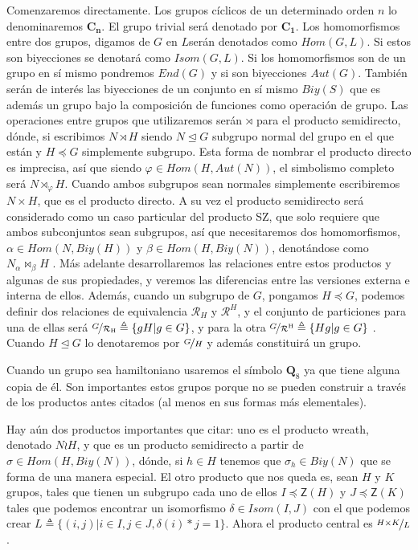 \documentclass[12pt,a4paper,fleqn,spanish,final,openright]{extbook}
\theoremstyle{definition}
\theoremstyle{remark}
\begin{document}
Comenzaremos directamente. Los grupos cíclicos de un determinado orden
$n$ lo denominaremos $\mathbf{C_{n}}$. El grupo trivial será denotado
por $\mathbf{C_1}$. Los homomorfismos entre dos grupos, digamos
de $G$ en $L$serán denotados como $Hom(G,L)$. Si estos son biyecciones
se denotará como $Isom(G,L)$. Si los homomorfismos son de un grupo
en sí mismo pondremos $End(G)$ y si son biyecciones $Aut(G)$. También
serán de interés las biyecciones de un conjunto en sí mismo $Biy(S)$
que es además un grupo bajo la composición de funciones como operación
de grupo. Las operaciones entre grupos que utilizaremos serán $\rtimes$
para el producto semidirecto, dónde, si escribimos $N\rtimes H$ siendo
$N \trianglelefteq G$ subgrupo normal del grupo en el que están y
$H \preccurlyeq G$ simplemente subgrupo. Esta forma de nombrar el
producto directo es imprecisa, así que siendo $\varphi \in Hom(H,Aut(N))$,
el simbolismo completo será $N\rtimes_{\varphi }H$. Cuando ambos subgrupos
sean normales simplemente escribiremos $N\times  H$, que es el producto
directo. A su vez el producto semidirecto será considerado como un
caso particular del producto SZ, que solo requiere que ambos subconjuntos
sean subgrupos, así que necesitaremos dos homomorfismos, $\alpha \in Hom(N,Biy(H))$
y $\beta \in Hom(H,Biy(N))$, denotándose como $N_{\alpha \!}\bowtie_{\beta }H$
. Más adelante desarrollaremos las relaciones entre estos productos
y algunas de sus propiedades, y veremos las diferencias entre las
versiones externa e interna de ellos. Además, cuando un subgrupo de
$G$, pongamos $H \preccurlyeq G$, podemos definir dos relaciones
de equivalencia $\mathcal{R}_{H}$ y $\mathcal{R}^{H}$, y el conjunto
de particiones para una de ellas será $\nicefrac{G}{{\mathcal{R}}_{\mathrm{H}}}
\triangleq\lbrace gH \vert g\in G\rbrace$,
y para la otra 
$\nicefrac{G}{{\mathcal{R}}^{\mathrm{H}}}\triangleq\lbrace Hg|g\in G\rbrace$
. Cuando $H\trianglelefteq G$ lo denotaremos por $\nicefrac{G}{H}$
y además constituirá un grupo.

Cuando un grupo sea hamiltoniano usaremos el símbolo $\boldsymbol{Q}_{8}$ ya
que tiene alguna copia de él. Son importantes estos grupos porque
no se pueden construir a través de los productos antes citados (al menos en 
sus formas más elementales).

Hay aún dos productos importantes que citar: uno es el producto wreath,
denotado $N\wr H$, y que es un producto semidirecto a partir de
$\sigma \in Hom(H,Biy(N))$, dónde, si $h \in H$ tenemos que $\sigma_{h} \in Biy(N)$
que se forma de una manera especial. El otro producto que nos queda
es, sean $H$ y $K$ grupos, tales que tienen un subgrupo cada uno
de ellos $I \preccurlyeq \mathsf{Z}(H)$ y $J \preccurlyeq \mathsf{Z}(K)$
tales que podemos encontrar un isomorfismo $\delta \in Isom(I,J)$
con el que podemos crear $L\triangleq\lbrace(i,j) \vert i\in I,j\in J,\delta (i)*j=1\rbrace$.
Ahora el producto central es $\nicefrac{H\times K}{L}$.
\end{document}
